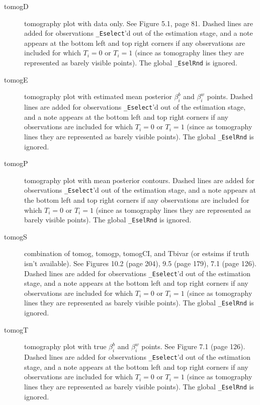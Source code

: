\documentclass[11pt,titlepage]{article}
\begin{document}
\begin{description}
\item[tomogD] tomography plot with data only.  See Figure 5.1, page
  81.  Dashed lines are added for observations \texttt{\_Eselect}'d
  out of the estimation stage, and a note appears at the bottom left
  and top right corners if any observations are included for which
  $T_i=0$ or $T_i=1$ (since as tomography lines they are represented
  as barely visible points).  The global \texttt{\_EselRnd} is
  ignored.

\item[tomogE] tomography plot with estimated mean posterior
  $\beta_i^b$ and $\beta_i^w$ points.  Dashed lines are added for
  observations \texttt{\_Eselect}'d out of the estimation stage, and a
  note appears at the bottom left and top right corners if any
  observations are included for which $T_i=0$ or $T_i=1$ (since as
  tomography lines they are represented as barely visible points).
  The global \texttt{\_EselRnd} is ignored.

\item[tomogP] tomography plot with mean posterior contours.  Dashed
  lines are added for observations \texttt{\_Eselect}'d out of the
  estimation stage, and a note appears at the bottom left and top
  right corners if any observations are included for which $T_i=0$ or
  $T_i=1$ (since as tomography lines they are represented as barely
  visible points).  The global \texttt{\_EselRnd} is ignored.

\item[tomogS] combination of tomog, tomogp, tomogCI, and Tbivar (or
  estsims if truth isn't available).  See Figures 10.2 (page 204), 9.5
  (page 179), 7.1 (page 126).  Dashed lines are added for observations
  \texttt{\_Eselect}'d out of the estimation stage, and a note appears
  at the bottom left and top right corners if any observations are
  included for which $T_i=0$ or $T_i=1$ (since as tomography lines
  they are represented as barely visible points).  The global
  \texttt{\_EselRnd} is ignored.

\item[tomogT] tomography plot with true $\beta_i^b$ and $\beta_i^w$
  points.  See Figure 7.1 (page 126). Dashed lines are added for
  observations \texttt{\_Eselect}'d out of the estimation stage, and a
  note appears at the bottom left and top right corners if any
  observations are included for which $T_i=0$ or $T_i=1$ (since as
  tomography lines they are represented as barely visible points).
  The global \texttt{\_EselRnd} is ignored.


\end{description}
\end{document}
